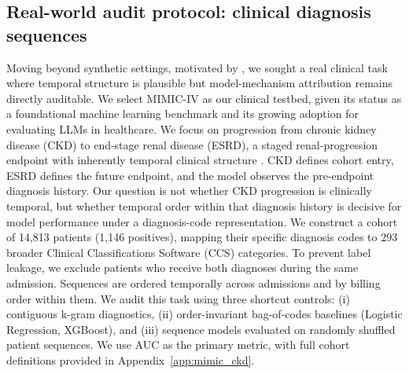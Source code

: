 \documentclass{article}
\theoremstyle{plain}
\theoremstyle{definition}
\theoremstyle{remark}
\begin{document}
\subsection{Real-world audit protocol: clinical diagnosis sequences}
\label{subsec:mimic_ckd_protocol}
Moving beyond synthetic settings, motivated by \citep{edelman2026order_specific_ehr}, we sought a real clinical task where temporal structure is plausible but model-mechanism attribution remains directly auditable. We select MIMIC-IV \citep{johnson2024mimiciv31,johnson2023mimiciv} as our clinical testbed, given its status as a foundational machine learning benchmark and its growing adoption for evaluating LLMs in healthcare. We focus on progression from chronic kidney disease (CKD) to end-stage renal disease (ESRD), a staged renal-progression endpoint with inherently temporal clinical structure \citep{kdigo2024ckd,sumida2017disease_trajectories_esrd}. CKD defines cohort entry, ESRD defines the future endpoint, and the model observes the pre-endpoint diagnosis history. Our question is not whether CKD progression is clinically temporal, but whether temporal order within that diagnosis history is decisive for model performance under a diagnosis-code representation. We construct a cohort of 14,813 patients (1,146 positives), mapping their specific diagnosis codes to $293$ broader Clinical Classifications Software (CCS) categories. To prevent label leakage, we exclude patients who receive both diagnoses during the same admission. Sequences are ordered temporally across admissions and by billing order within them. We audit this task using three shortcut controls: (i) contiguous k-gram diagnostics, (ii) order-invariant bag-of-codes baselines (Logistic Regression, XGBoost), and (iii) sequence models evaluated on randomly shuffled patient sequences. We use AUC as the primary metric, with full cohort definitions provided in Appendix~\ref{app:mimic_ckd}.
\end{document}
